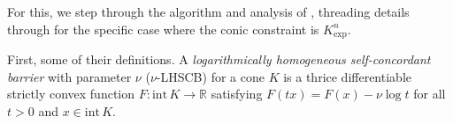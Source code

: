 \documentclass[twoside]{article}
\begin{document}
\begin{lproof}
    For this, we step through the algorithm and analysis of
     \textcite{badenbroek2021algorithm}, threading details through for the specific case
    where the conic constraint is $K_{\exp}^n$.
    
    First, some of their definitions.
    A \emph{logarithmically homogeneous self-concordant barrier} with parameter $\nu$ ($\nu$-LHSCB) for a cone $K$ is a thrice differentiable strictly convex function $F: \mathrm{int}\, K \to \mathbb R$ satisfying
    $F(tx) = F(x) - \nu \log t$
    for all $t > 0$ and $x \in \mathrm{int}\, K$. 
    
    

\end{lproof}
\end{document}
